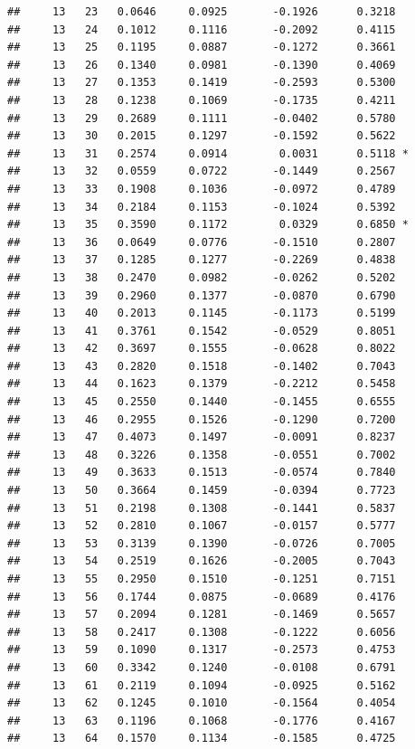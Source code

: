 \documentclass[
]{article}
\begin{document}
\begin{verbatim}
##     13   23   0.0646     0.0925       -0.1926      0.3218  
##     13   24   0.1012     0.1116       -0.2092      0.4115  
##     13   25   0.1195     0.0887       -0.1272      0.3661  
##     13   26   0.1340     0.0981       -0.1390      0.4069  
##     13   27   0.1353     0.1419       -0.2593      0.5300  
##     13   28   0.1238     0.1069       -0.1735      0.4211  
##     13   29   0.2689     0.1111       -0.0402      0.5780  
##     13   30   0.2015     0.1297       -0.1592      0.5622  
##     13   31   0.2574     0.0914        0.0031      0.5118 *
##     13   32   0.0559     0.0722       -0.1449      0.2567  
##     13   33   0.1908     0.1036       -0.0972      0.4789  
##     13   34   0.2184     0.1153       -0.1024      0.5392  
##     13   35   0.3590     0.1172        0.0329      0.6850 *
##     13   36   0.0649     0.0776       -0.1510      0.2807  
##     13   37   0.1285     0.1277       -0.2269      0.4838  
##     13   38   0.2470     0.0982       -0.0262      0.5202  
##     13   39   0.2960     0.1377       -0.0870      0.6790  
##     13   40   0.2013     0.1145       -0.1173      0.5199  
##     13   41   0.3761     0.1542       -0.0529      0.8051  
##     13   42   0.3697     0.1555       -0.0628      0.8022  
##     13   43   0.2820     0.1518       -0.1402      0.7043  
##     13   44   0.1623     0.1379       -0.2212      0.5458  
##     13   45   0.2550     0.1440       -0.1455      0.6555  
##     13   46   0.2955     0.1526       -0.1290      0.7200  
##     13   47   0.4073     0.1497       -0.0091      0.8237  
##     13   48   0.3226     0.1358       -0.0551      0.7002  
##     13   49   0.3633     0.1513       -0.0574      0.7840  
##     13   50   0.3664     0.1459       -0.0394      0.7723  
##     13   51   0.2198     0.1308       -0.1441      0.5837  
##     13   52   0.2810     0.1067       -0.0157      0.5777  
##     13   53   0.3139     0.1390       -0.0726      0.7005  
##     13   54   0.2519     0.1626       -0.2005      0.7043  
##     13   55   0.2950     0.1510       -0.1251      0.7151  
##     13   56   0.1744     0.0875       -0.0689      0.4176  
##     13   57   0.2094     0.1281       -0.1469      0.5657  
##     13   58   0.2417     0.1308       -0.1222      0.6056  
##     13   59   0.1090     0.1317       -0.2573      0.4753  
##     13   60   0.3342     0.1240       -0.0108      0.6791  
##     13   61   0.2119     0.1094       -0.0925      0.5162  
##     13   62   0.1245     0.1010       -0.1564      0.4054  
##     13   63   0.1196     0.1068       -0.1776      0.4167  
##     13   64   0.1570     0.1134       -0.1585      0.4725  

\end{verbatim}
\end{document}
